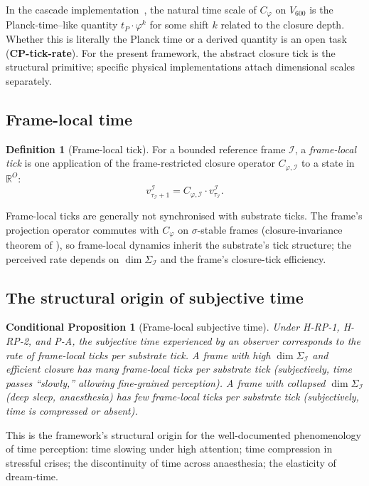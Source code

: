 \documentclass[11pt]{article}
\theoremstyle{plain}
\newtheorem{conditional}[theorem]{Conditional Proposition}
\theoremstyle{definition}
\newtheorem{definition}[theorem]{Definition}
\theoremstyle{remark}
\newcommand{\Ical}{\mathcal{I}}
\newcommand{\Cph}{C_\varphi}
\begin{document}
In the cascade implementation~\citep{SmartHypersphereCosmology}, the natural time scale of $\Cph$ on $V_{600}$ is the Planck-time–like quantity $t_P \cdot \varphi^k$ for some shift $k$ related to the closure depth. Whether this is literally the Planck time or a derived quantity is an open task (\textbf{CP-tick-rate}). For the present framework, the abstract closure tick is the structural primitive; specific physical implementations attach dimensional scales separately.

\subsection{Frame-local time}

\begin{definition}[Frame-local tick]\label{def:frame-tick}
For a bounded reference frame $\Ical$, a \emph{frame-local tick} is one application of the frame-restricted closure operator $C_{\varphi,\Ical}$ to a state in $\mathbb{R}^O$:
\[
  v^\Ical_{\tau_\Ical + 1} = C_{\varphi,\Ical} \cdot v^\Ical_{\tau_\Ical}.
\]
\end{definition}

Frame-local ticks are generally not synchronised with substrate ticks. The frame's projection operator commutes with $\Cph$ on $\sigma$-stable frames (closure-invariance theorem of \citet{SmartExistenceClosure}), so frame-local dynamics inherit the substrate's tick structure; the perceived rate depends on $\dim \Sigma_\Ical$ and the frame's closure-tick efficiency.

\subsection{The structural origin of subjective time}

\begin{conditional}[Frame-local subjective time]\label{cthm:frame-time}
Under H-RP-1, H-RP-2, and P-A, the subjective time experienced by an observer corresponds to the rate of frame-local ticks per substrate tick. A frame with high $\dim \Sigma_\Ical$ and efficient closure has many frame-local ticks per substrate tick (subjectively, time passes ``slowly,'' allowing fine-grained perception). A frame with collapsed $\dim \Sigma_\Ical$ (deep sleep, anaesthesia) has few frame-local ticks per substrate tick (subjectively, time is compressed or absent).
\end{conditional}

This is the framework's structural origin for the well-documented phenomenology of time perception: time slowing under high attention; time compression in stressful crises; the discontinuity of time across anaesthesia; the elasticity of dream-time.
\end{document}
